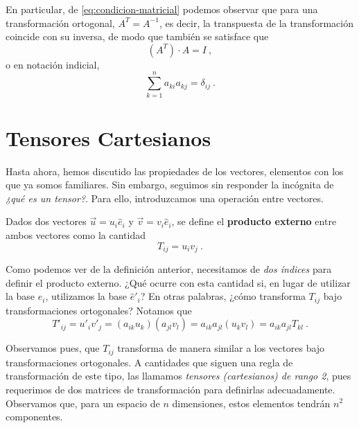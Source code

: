 En particular, de \eqref{eq:condicion-matricial} podemos observar que para una transformación ortogonal, $A^T = A^{-1}$, es decir, la transpuesta de la transformación coincide con su inversa, de modo que también se satisface que
\begin{equation}
    (A^T) \cdot A = I \ ,
\end{equation}
o en notación indicial,
\begin{equation}
    \sum_{k=1}^n a_{ki} a_{kj} =  \delta_{ij} \ .
\end{equation}

\section{Tensores Cartesianos}

Hasta ahora, hemos discutido las propiedades de los vectores, elementos con los que ya somos familiares. Sin embargo, seguimos sin responder la incógnita de \emph{¿qué es un tensor?}. Para ello, introduzcamos una operación entre vectores.

\begin{defi}
    Dados dos vectores $\vec{u} = u_i \hat{e}_i$ y $\vec{v} = v_i \hat{e}_i$, se define el \textbf{producto externo} entre ambos vectores como la cantidad
    \begin{equation}
        T_{ij} = u_i v_j \ .
    \end{equation}
\end{defi}

Como podemos ver de la definición anterior, necesitamos de \emph{dos índices} para definir el producto externo. ¿Qué ocurre con esta cantidad si, en lugar de utilizar la base $\hat{e}_i$, utilizamos la base $\hat{e}'_i$? En otras palabras, ¿cómo transforma $T_{ij}$ bajo transformaciones ortogonales? Notamos que
\begin{equation}
    T'_{ij} = u'_i v'_j = (a_{ik}u_k)(a_{jl} v_l) = a_{ik} a_{jl} (u_k v_l) =  a_{ik} a_{jl} T_{kl} \ .
\end{equation}

Observamos pues, que $T_{ij}$ transforma de manera similar a los vectores bajo transformaciones ortogonales. A cantidades que siguen una regla de transformación de este tipo, las llamamos \emph{tensores (cartesianos) de rango 2}, pues requerimos de dos matrices de transformación para definirlas adecuadamente. Observamos que, para un espacio de $n$ dimensiones, estos elementos tendrán $n^2$ componentes.

